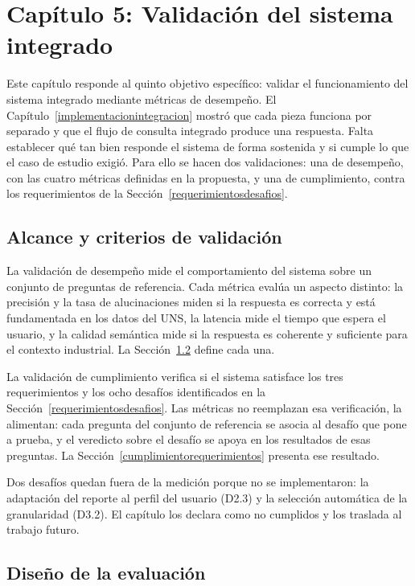 \section{Capítulo 5: Validación del sistema integrado}
\label{validacionsistema}

Este capítulo responde al quinto objetivo específico: validar el funcionamiento del sistema integrado mediante métricas de desempeño. El Capítulo~\ref{implementacionintegracion} mostró que cada pieza funciona por separado y que el flujo de consulta integrado produce una respuesta. Falta establecer qué tan bien responde el sistema de forma sostenida y si cumple lo que el caso de estudio exigió. Para ello se hacen dos validaciones: una de desempeño, con las cuatro métricas definidas en la propuesta, y una de cumplimiento, contra los requerimientos de la Sección~\ref{requerimientosdesafios}.

\subsection{Alcance y criterios de validación}
\label{alcancevalidacion}

La validación de desempeño mide el comportamiento del sistema sobre un conjunto de preguntas de referencia. Cada métrica evalúa un aspecto distinto: la precisión y la tasa de alucinaciones miden si la respuesta es correcta y está fundamentada en los datos del UNS, la latencia mide el tiempo que espera el usuario, y la calidad semántica mide si la respuesta es coherente y suficiente para el contexto industrial. La Sección~\ref{disenoevaluacion} define cada una.

La validación de cumplimiento verifica si el sistema satisface los tres requerimientos y los ocho desafíos identificados en la Sección~\ref{requerimientosdesafios}. Las métricas no reemplazan esa verificación, la alimentan: cada pregunta del conjunto de referencia se asocia al desafío que pone a prueba, y el veredicto sobre el desafío se apoya en los resultados de esas preguntas. La Sección~\ref{cumplimientorequerimientos} presenta ese resultado.

Dos desafíos quedan fuera de la medición porque no se implementaron: la adaptación del reporte al perfil del usuario (D2.3) y la selección automática de la granularidad (D3.2). El capítulo los declara como no cumplidos y los traslada al trabajo futuro.

\subsection{Diseño de la evaluación}
\label{disenoevaluacion}

